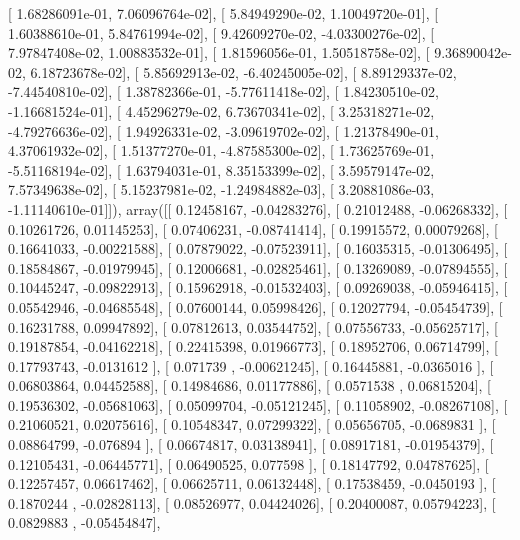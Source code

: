 \documentclass{article}
\begin{document}
       [  1.68286091e-01,   7.06096764e-02],
       [  5.84949290e-02,   1.10049720e-01],
       [  1.60388610e-01,   5.84761994e-02],
       [  9.42609270e-02,  -4.03300276e-02],
       [  7.97847408e-02,   1.00883532e-01],
       [  1.81596056e-01,   1.50518758e-02],
       [  9.36890042e-02,   6.18723678e-02],
       [  5.85692913e-02,  -6.40245005e-02],
       [  8.89129337e-02,  -7.44540810e-02],
       [  1.38782366e-01,  -5.77611418e-02],
       [  1.84230510e-02,  -1.16681524e-01],
       [  4.45296279e-02,   6.73670341e-02],
       [  3.25318271e-02,  -4.79276636e-02],
       [  1.94926331e-02,  -3.09619702e-02],
       [  1.21378490e-01,   4.37061932e-02],
       [  1.51377270e-01,  -4.87585300e-02],
       [  1.73625769e-01,  -5.51168194e-02],
       [  1.63794031e-01,   8.35153399e-02],
       [  3.59579147e-02,   7.57349638e-02],
       [  5.15237981e-02,  -1.24984882e-03],
       [  3.20881086e-03,  -1.11140610e-01]]), array([[ 0.12458167, -0.04283276],
       [ 0.21012488, -0.06268332],
       [ 0.10261726,  0.01145253],
       [ 0.07406231, -0.08741414],
       [ 0.19915572,  0.00079268],
       [ 0.16641033, -0.00221588],
       [ 0.07879022, -0.07523911],
       [ 0.16035315, -0.01306495],
       [ 0.18584867, -0.01979945],
       [ 0.12006681, -0.02825461],
       [ 0.13269089, -0.07894555],
       [ 0.10445247, -0.09822913],
       [ 0.15962918, -0.01532403],
       [ 0.09269038, -0.05946415],
       [ 0.05542946, -0.04685548],
       [ 0.07600144,  0.05998426],
       [ 0.12027794, -0.05454739],
       [ 0.16231788,  0.09947892],
       [ 0.07812613,  0.03544752],
       [ 0.07556733, -0.05625717],
       [ 0.19187854, -0.04162218],
       [ 0.22415398,  0.01966773],
       [ 0.18952706,  0.06714799],
       [ 0.17793743, -0.0131612 ],
       [ 0.071739  , -0.00621245],
       [ 0.16445881, -0.0365016 ],
       [ 0.06803864,  0.04452588],
       [ 0.14984686,  0.01177886],
       [ 0.0571538 ,  0.06815204],
       [ 0.19536302, -0.05681063],
       [ 0.05099704, -0.05121245],
       [ 0.11058902, -0.08267108],
       [ 0.21060521,  0.02075616],
       [ 0.10548347,  0.07299322],
       [ 0.05656705, -0.0689831 ],
       [ 0.08864799, -0.076894  ],
       [ 0.06674817,  0.03138941],
       [ 0.08917181, -0.01954379],
       [ 0.12105431, -0.06445771],
       [ 0.06490525,  0.077598  ],
       [ 0.18147792,  0.04787625],
       [ 0.12257457,  0.06617462],
       [ 0.06625711,  0.06132448],
       [ 0.17538459, -0.0450193 ],
       [ 0.1870244 , -0.02828113],
       [ 0.08526977,  0.04424026],
       [ 0.20400087,  0.05794223],
       [ 0.0829883 , -0.05454847],
\end{document}
